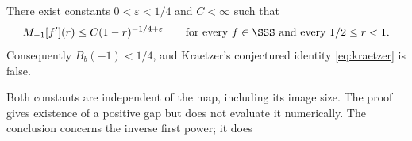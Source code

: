 \begin{theorem}\label{thm:main}
There exist constants \(0<\varepsilon<1/4\) and \(C<\infty\) such that
\begin{equation}\label{eq:uniform}
 M_{-1}[f'](r)\le C(1-r)^{-1/4+\varepsilon}
 \qquad\text{for every }f\in\SSS\text{ and every }1/2\le r<1.
\end{equation}
Consequently \(B_b(-1)<1/4\), and Kraetzer's conjectured identity
\eqref{eq:kraetzer} is false.
\end{theorem}

Both constants are independent of the map, including its image size.
The proof gives existence of a positive gap but does not evaluate it
numerically. The conclusion concerns the inverse first power; it does
